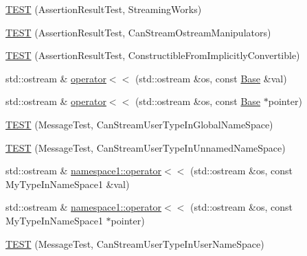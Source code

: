 \begin{DoxyCompactItemize}
\item 
\mbox{\hyperlink{_obj__test_2lib_2googletest-release-1_88_81_2googletest_2test_2gtest__unittest_8cc_acdfdc68a5959b52a59f9dd0cccc3f390}{T\+E\+ST}} (Assertion\+Result\+Test, Streaming\+Works)
\item 
\mbox{\hyperlink{_obj__test_2lib_2googletest-release-1_88_81_2googletest_2test_2gtest__unittest_8cc_a9f44af0752c3f08c932e2750905c6d79}{T\+E\+ST}} (Assertion\+Result\+Test, Can\+Stream\+Ostream\+Manipulators)
\item 
\mbox{\hyperlink{_obj__test_2lib_2googletest-release-1_88_81_2googletest_2test_2gtest__unittest_8cc_a4e5c52db04c25d8718f584bf5f74c62a}{T\+E\+ST}} (Assertion\+Result\+Test, Constructible\+From\+Implicitly\+Convertible)
\item 
std\+::ostream \& \mbox{\hyperlink{_obj__test_2lib_2googletest-release-1_88_81_2googletest_2test_2gtest__unittest_8cc_ab80209c07a91db303a9d415dc9bd4e81}{operator$<$$<$}} (std\+::ostream \&os, const \mbox{\hyperlink{class_base}{Base}} \&val)
\item 
std\+::ostream \& \mbox{\hyperlink{_obj__test_2lib_2googletest-release-1_88_81_2googletest_2test_2gtest__unittest_8cc_ac4fc0177334a6fd32b81376c9a2a2dc6}{operator$<$$<$}} (std\+::ostream \&os, const \mbox{\hyperlink{class_base}{Base}} $\ast$pointer)
\item 
\mbox{\hyperlink{_obj__test_2lib_2googletest-release-1_88_81_2googletest_2test_2gtest__unittest_8cc_a3cfb4c4e94683c4677706c53ab52fb8e}{T\+E\+ST}} (Message\+Test, Can\+Stream\+User\+Type\+In\+Global\+Name\+Space)
\item 
\mbox{\hyperlink{_obj__test_2lib_2googletest-release-1_88_81_2googletest_2test_2gtest__unittest_8cc_ab9dfac778014c6214ff30da9c74cbffe}{T\+E\+ST}} (Message\+Test, Can\+Stream\+User\+Type\+In\+Unnamed\+Name\+Space)
\item 
std\+::ostream \& \mbox{\hyperlink{namespacenamespace1_a469f00dab6318267fb48fab73226ca95}{namespace1\+::operator$<$$<$}} (std\+::ostream \&os, const My\+Type\+In\+Name\+Space1 \&val)
\item 
std\+::ostream \& \mbox{\hyperlink{namespacenamespace1_a9be9cab39b3a33a012040d70e1c86949}{namespace1\+::operator$<$$<$}} (std\+::ostream \&os, const My\+Type\+In\+Name\+Space1 $\ast$pointer)
\item 
\mbox{\hyperlink{_obj__test_2lib_2googletest-release-1_88_81_2googletest_2test_2gtest__unittest_8cc_ac87850465b99bd7121b521b2da5966f4}{T\+E\+ST}} (Message\+Test, Can\+Stream\+User\+Type\+In\+User\+Name\+Space)
\item 

\end{DoxyCompactItemize}
